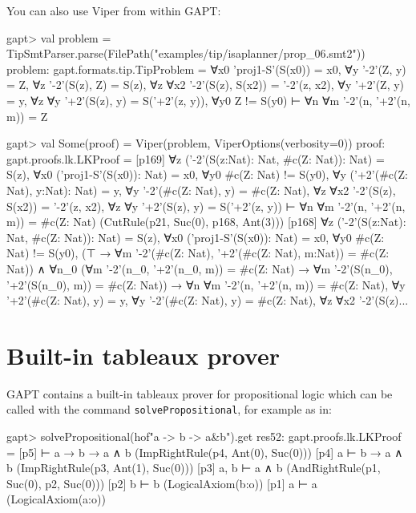\documentclass[a4paper,11pt]{book}
\begin{document}
You can also use Viper from within GAPT:
\begin{clilisting}
gapt> val problem = TipSmtParser.parse(FilePath("examples/tip/isaplanner/prop_06.smt2"))
problem: gapt.formats.tip.TipProblem =
∀x0 'proj1-S'(S(x0)) = x0,
∀y '-2'(Z, y) = Z,
∀z '-2'(S(z), Z) = S(z),
∀z ∀x2 '-2'(S(z), S(x2)) = '-2'(z, x2),
∀y '+2'(Z, y) = y,
∀z ∀y '+2'(S(z), y) = S('+2'(z, y)),
∀y0 Z != S(y0)
⊢
∀n ∀m '-2'(n, '+2'(n, m)) = Z

gapt> val Some(proof) = Viper(problem, ViperOptions(verbosity=0))
proof: gapt.proofs.lk.LKProof =
[p169] ∀z ('-2'(S(z:Nat): Nat, #c(Z: Nat)): Nat) = S(z),
∀x0 ('proj1-S'(S(x0)): Nat) = x0,
∀y0 #c(Z: Nat) != S(y0),
∀y ('+2'(#c(Z: Nat), y:Nat): Nat) = y,
∀y '-2'(#c(Z: Nat), y) = #c(Z: Nat),
∀z ∀x2 '-2'(S(z), S(x2)) = '-2'(z, x2),
∀z ∀y '+2'(S(z), y) = S('+2'(z, y))
⊢
∀n ∀m '-2'(n, '+2'(n, m)) = #c(Z: Nat)    (CutRule(p21, Suc(0), p168, Ant(3)))
[p168] ∀z ('-2'(S(z:Nat): Nat, #c(Z: Nat)): Nat) = S(z),
∀x0 ('proj1-S'(S(x0)): Nat) = x0,
∀y0 #c(Z: Nat) != S(y0),
(⊤ → ∀m '-2'(#c(Z: Nat), '+2'(#c(Z: Nat), m:Nat)) = #c(Z: Nat)) ∧
    ∀n_0
    (∀m '-2'(n_0, '+2'(n_0, m)) = #c(Z: Nat) →
      ∀m '-2'(S(n_0), '+2'(S(n_0), m)) = #c(Z: Nat)) →
  ∀n ∀m '-2'(n, '+2'(n, m)) = #c(Z: Nat),
∀y '+2'(#c(Z: Nat), y) = y,
∀y '-2'(#c(Z: Nat), y) = #c(Z: Nat),
∀z ∀x2 '-2'(S(z)...

\end{clilisting}

\section{Built-in tableaux prover}

GAPT contains a built-in tableaux prover for propositional logic
which can be called with the command \texttt{solvePropositional}, for example as in:
\begin{clilisting}
gapt> solvePropositional(hof"a -> b -> a&b").get
res52: gapt.proofs.lk.LKProof =
[p5]  ⊢ a → b → a ∧ b    (ImpRightRule(p4, Ant(0), Suc(0)))
[p4] a ⊢ b → a ∧ b    (ImpRightRule(p3, Ant(1), Suc(0)))
[p3] a, b ⊢ a ∧ b    (AndRightRule(p1, Suc(0), p2, Suc(0)))
[p2] b ⊢ b    (LogicalAxiom(b:o))
[p1] a ⊢ a    (LogicalAxiom(a:o))

\end{clilisting}
\end{document}
